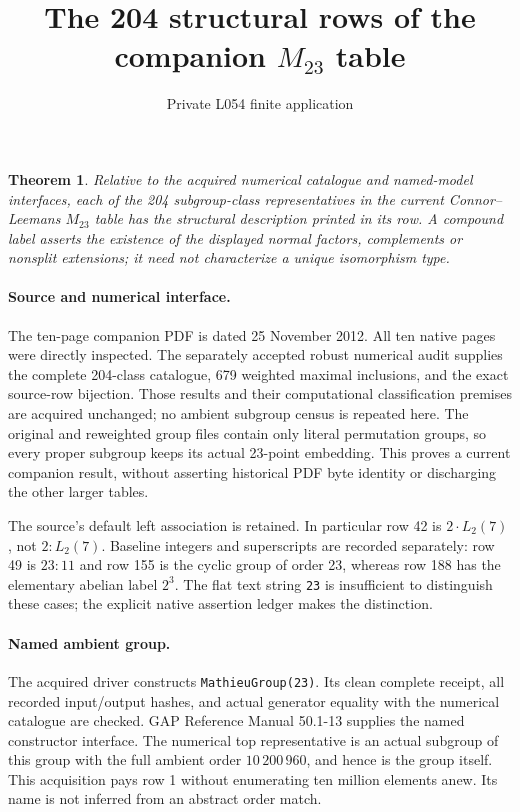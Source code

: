 \documentclass[11pt]{article}
\title{The 204 structural rows of the companion $M_{23}$ table}
\author{Private L054 finite application}\date{}
\newtheorem{theorem}{Theorem}
\begin{document}
\maketitle
\begin{theorem}
Relative to the acquired numerical catalogue and named-model interfaces,
each of the 204 subgroup-class representatives in the current Connor--Leemans
$M_{23}$ table has the structural description printed in its row. A compound
label asserts the existence of the displayed normal factors, complements
or nonsplit extensions; it need not characterize a unique isomorphism type.
\end{theorem}
\paragraph{Source and numerical interface.}
The ten-page companion PDF is dated 25 November 2012. All ten native pages
were directly inspected. The separately accepted robust numerical audit
supplies the complete 204-class catalogue, 679 weighted maximal inclusions,
and the exact source-row bijection. Those results and their computational
classification premises are acquired unchanged; no ambient subgroup census
is repeated here. The original and reweighted group files contain only
literal permutation groups, so every proper subgroup keeps its actual
23-point embedding. This proves a current companion result, without asserting
historical PDF byte identity or discharging the other larger tables.

The source's default left association is retained. In particular row 42 is
$2\mathbin{\cdot}L_2(7)$, not $2:L_2(7)$. Baseline integers and superscripts
are recorded separately: row 49 is $23:11$ and row 155 is the cyclic group
of order 23, whereas row 188 has the elementary abelian label $2^3$.
The flat text string \texttt{23} is insufficient to distinguish these cases;
the explicit native assertion ledger makes the distinction.

\paragraph{Named ambient group.}
The acquired driver constructs \texttt{MathieuGroup(23)}.
Its clean complete receipt, all recorded input/output hashes, and actual
generator equality with the numerical catalogue are checked. GAP Reference
Manual 50.1-13 supplies the named constructor interface. The numerical top
representative is an actual subgroup of this group with the full ambient
order $10\,200\,960$, and hence is the group itself. This acquisition pays
row 1 without enumerating ten million elements anew. Its name is not inferred
from an abstract order match.
\end{document}
